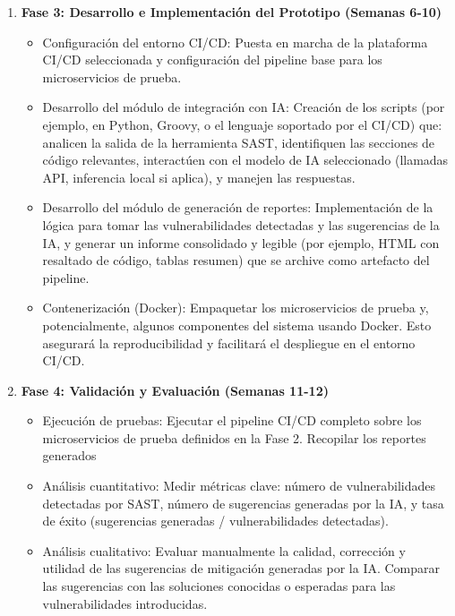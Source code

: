 \begin{enumerate}
    \item \textbf{Fase 3: Desarrollo e Implementación del Prototipo (Semanas 6-10)}
    \begin{itemize}
        \item Configuración del entorno CI/CD: Puesta en marcha de la plataforma CI/CD seleccionada y configuración del pipeline base para los microservicios de prueba.
        \item Desarrollo del módulo de integración con IA: Creación de los scripts (por ejemplo, en Python, Groovy, o el lenguaje soportado por el CI/CD) que: analicen la salida de la herramienta SAST, identifiquen las secciones de código relevantes, interactúen con el modelo de IA seleccionado (llamadas API, inferencia local si aplica), y manejen las respuestas.
        \item Desarrollo del módulo de generación de reportes: Implementación de la lógica para tomar las vulnerabilidades detectadas y las sugerencias de la IA, y generar un informe consolidado y legible (por ejemplo, HTML con resaltado de código, tablas resumen) que se archive como artefacto del pipeline.
        \item Contenerización (Docker): Empaquetar los microservicios de prueba y, potencialmente, algunos componentes del sistema usando Docker. Esto asegurará la reproducibilidad y facilitará el despliegue en el entorno CI/CD.
    \end{itemize}
    
    \item \textbf{Fase 4: Validación y Evaluación (Semanas 11-12)}
    \begin{itemize}
        \item Ejecución de pruebas: Ejecutar el pipeline CI/CD completo sobre los microservicios de prueba definidos en la Fase 2. Recopilar los reportes generados
        \item Análisis cuantitativo: Medir métricas clave: número de vulnerabilidades detectadas por SAST, número de sugerencias generadas por la IA, y tasa de éxito (sugerencias generadas / vulnerabilidades detectadas).
        \item Análisis cualitativo: Evaluar manualmente la calidad, corrección y utilidad de las sugerencias de mitigación generadas por la IA. Comparar las sugerencias con las soluciones conocidas o esperadas para las vulnerabilidades introducidas.
    \end{itemize}
\end{enumerate}